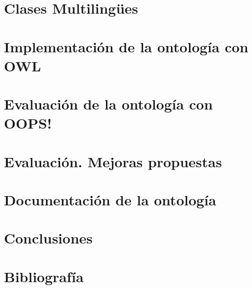 \documentclass[a4paper,12pt]{article}
\begin{document}
	\section{Clases Multilingües}
	
	\section{Implementación de la ontología con OWL}
	
	\section{Evaluación de la ontología con OOPS!}
	
	\section{Evaluación. Mejoras propuestas}
	
	\section{Documentación de la ontología}
	
	\section{Conclusiones}
	
	
\newpage
	\section*{Bibliografía}
	
	
\end{document}
